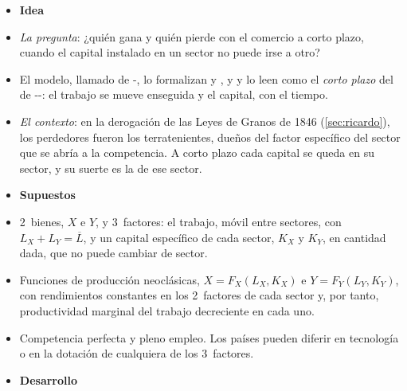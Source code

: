 \documentclass[11pt]{article}
\begin{document}
\begin{itemize}
\item[] \textbf{Idea}

\item \emph{La pregunta}: ¿quién gana y quién pierde con el comercio a corto plazo, cuando el capital instalado en un sector no puede irse a otro?
\item El modelo, llamado de -, lo formalizan \textcite{Jones1971Three} y \textcite{Samuelson1971Ohlin}, y \textcite{Mussa1974Tariffs} y \textcite{Neary1978Short} lo leen como el \emph{corto plazo} del de --: el trabajo se mueve enseguida y el capital, con el tiempo.
\item \emph{El contexto}: en la derogación de las Leyes de Granos de 1846 (\ref{sec:ricardo}), los perdedores fueron los terratenientes, dueños del factor específico del sector que se abría a la competencia. A corto plazo cada capital se queda en su sector, y su suerte es la de ese sector.
\item[] \textbf{Supuestos}

\item 2~bienes, $X$ e $Y$, y 3~factores: el trabajo, móvil entre sectores, con $L_X+L_Y=\overline L$, y un capital específico de cada sector, $K_X$ y $K_Y$, en cantidad dada, que no puede cambiar de sector.
\item Funciones de producción neoclásicas, $X=F_X(L_X,K_X)$ e $Y=F_Y(L_Y,K_Y)$, con rendimientos constantes en los 2~factores de cada sector y, por tanto, productividad marginal del trabajo decreciente en cada uno.
\item Competencia perfecta y pleno empleo. Los países pueden diferir en tecnología o en la dotación de cualquiera de los 3~factores.
\item[] \textbf{Desarrollo}


\end{itemize}
\end{document}
